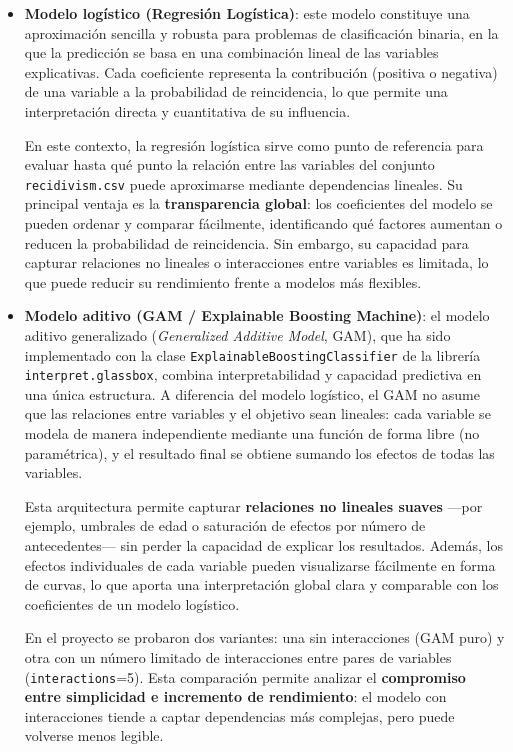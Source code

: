 \begin{itemize}
  \item \textbf{Modelo logístico (Regresión Logística)}: 
  este modelo constituye una aproximación sencilla y robusta para problemas de clasificación binaria, en la que la predicción se basa en una combinación lineal de las variables explicativas. 
  Cada coeficiente representa la contribución (positiva o negativa) de una variable a la probabilidad de reincidencia, lo que permite una interpretación directa y cuantitativa de su influencia.
  \vspace{3mm}

  En este contexto, la regresión logística sirve como punto de referencia para evaluar hasta qué punto la relación entre las variables del conjunto \texttt{recidivism.csv} puede aproximarse mediante dependencias lineales. Su principal ventaja es la \textbf{transparencia global}: los coeficientes del modelo se pueden ordenar y comparar fácilmente, identificando qué factores aumentan o reducen la probabilidad de reincidencia. Sin embargo, su capacidad para capturar relaciones no lineales o interacciones entre variables es limitada, lo que puede reducir su rendimiento frente a modelos más flexibles.

  \vspace{3mm}
  \item \textbf{Modelo aditivo (GAM / Explainable Boosting Machine)}:
  el modelo aditivo generalizado (\textit{Generalized Additive Model}, GAM), que ha sido implementado con la clase \texttt{ExplainableBoostingClassifier} de la librería \texttt{interpret.glassbox}, combina interpretabilidad y capacidad predictiva en una única estructura. A diferencia del modelo logístico, el GAM no asume que las relaciones entre variables y el objetivo sean lineales: cada variable se modela de manera independiente mediante una función de forma libre (no paramétrica), y el resultado final se obtiene sumando los efectos de todas las variables.
  \vspace{3mm}

  Esta arquitectura permite capturar \textbf{relaciones no lineales suaves} —por ejemplo, umbrales de edad o saturación de efectos por número de antecedentes— sin perder la capacidad de explicar los resultados. Además, los efectos individuales de cada variable pueden visualizarse fácilmente en forma de curvas, lo que aporta una interpretación global clara y comparable con los coeficientes de un modelo logístico.
  \vspace{3mm}

  En el proyecto se probaron dos variantes: una sin interacciones (GAM puro) y otra con un número limitado de interacciones entre pares de variables (\texttt{interactions}=5). Esta comparación permite analizar el \textbf{compromiso entre simplicidad e incremento de rendimiento}: el modelo con interacciones tiende a captar dependencias más complejas, pero puede volverse menos legible.
\end{itemize}

